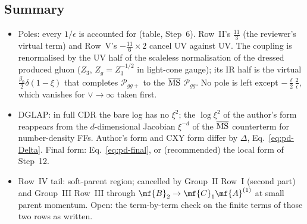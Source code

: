 \subsection{Summary}
\begin{itemize}
\item Poles: every $1/\epsilon$ is accounted for (table, Step~6). Row~II's $\frac{11}{3}$ (the reviewer's virtual term) and Row~V's $-\frac{11}{6}\times2$ cancel UV against UV. The coupling is renormalised by the UV half of the scaleless normalisation of the dressed produced gluon ($Z_{3}$, $Z_{g}=Z_{3}^{-1/2}$ in light-cone gauge); its IR half is the virtual $\frac{\beta_{0}}{2}\delta(1-\xi)$ that completes $\mathcal{P}_{gg+}$ to the $\overline{\rm MS}$ $\mathcal{P}_{gg}$. No pole is left except $-\frac{\ell}{2}\frac{2}{\epsilon}$, which vanishes for $\vee\to\infty$ taken first.
\item DGLAP: in full CDR the bare log has no $\xi^{2}$; the $\log\xi^{2}$ of the author's form reappears from the $d$-dimensional Jacobian $\xi^{-d}$ of the $\overline{\rm MS}$ counterterm for number-density FFs. Author's form and CXY form differ by $\Delta$, Eq.~\eqref{eq:pd-Delta}. Final form: Eq.~\eqref{eq:pd-final}, or (recommended) the local form of Step~12.
\item Row~IV tail: soft-parent region; cancelled by Group~II Row~I (second part) and Group~III Row~III through $\mf{B}_{2}\to\mf{C}_{1}\mf{A}^{(1)}$ at small parent momentum. Open: the term-by-term check on the finite terms of those two rows as written.
\end{itemize}
